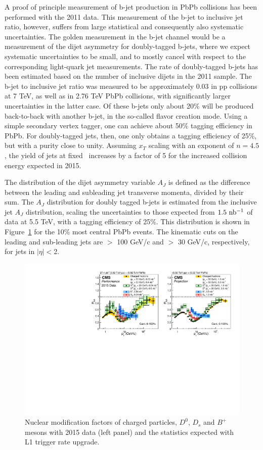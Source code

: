 A proof of principle measurement of b-jet production in PbPb collisions has
been performed with the 2011 data.  
This measurement of the b-jet to inclusive jet ratio, however, suffers from
large statistical and consequently also systematic uncertainties.  
The golden measurement in the b-jet channel would be a measurement of the
dijet asymmetry for doubly-tagged b-jets, 
where we expect systematic uncertainties to be small, and to mostly cancel
with respect to the corresponding light-quark jet measurements.  
The rate of doubly-tagged b-jets has been estimated based on the number
of inclusive dijets in the 2011 sample.  
The b-jet to inclusive jet ratio was measured to be approximately 0.03 in pp
collisions at 7 TeV, as well as in 2.76 TeV PbPb collisions, with 
significantly larger uncertainties in the latter case.  Of these b-jets only
about 20\% will be produced back-to-back with another b-jet, 
in the so-called flavor creation mode.  Using a simple secondary vertex
tagger, one can achieve about 50\% tagging efficiency in PbPb.  
For doubly-tagged jets, then, one only obtains a tagging efficiency of 25\%,
but with a purity close to unity.  
Assuming $x_{T}$ scaling with an exponent of $n = 4.5$, the yield of jets at
fixed \pt\ increases by a factor of 5 for the increased collision energy 
expected in 2015.  

The distribution of the dijet asymmetry variable $A_{J}$ is defined as the
difference between the leading and subleading jet transverse momenta,
divided by their sum.  
The $A_{J}$ distribution for doubly tagged b-jets is estimated from the
inclusive jet $A_{J}$ distribution, 
scaling the uncertainties to those expected from $1.5\ {\rm nb^{-1}}$ of data at
5.5 TeV, with a tagging efficiency of 25\%.  This distribution is shown in
Figure~\ref{fig:aj_2015} for the 10\% most central PbPb events.  
The kinematic cuts on the leading and sub-leading jets are \pt $>$ 100 GeV/c
and \pt $>$ 30 GeV/c, respectively, for jets in $|\eta| < $2.  


\begin{figure}[!ht]
\begin{center}
\includegraphics[width=.90\textwidth]{figures/cRAA_lumiTG_3_lumiMB_1_v2.pdf}
\caption{Nuclear modification factors of charged particles, $D^0$, $D_s$ and $B^+$ mesons with 2015 data (left panel) and the statistics expected with L1 trigger rate upgrade.}
\label{fig:aj_2015}
\end{center}
\end{figure}

